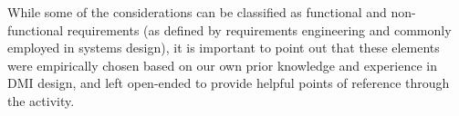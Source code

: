 \documentclass[letterpaper, 12pt]{article}
\begin{document}

While some of the considerations can be classified as functional and non-functional requirements (as defined by requirements engineering \citep{Glinz2007} and commonly employed in systems design), it is important to point out that these elements were empirically chosen based on our own prior knowledge and experience in DMI design, and left open-ended to provide helpful points of reference through the activity. 
\end{document}
